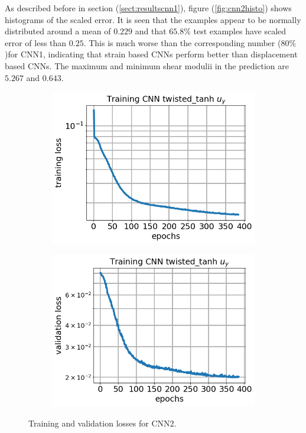 \documentclass[12pt]{article}
\newcommand{\nhghalfwidth}{0.48\linewidth}
\newcommand{\nhgtotalheight}{4cm}
\begin{document}
As described before in section (\ref{sect:resultscnn1}), figure (\ref{fig:cnn2histo}) shows histograms of the scaled error. It is seen that the examples appear to be normally distributed around a mean of ${0.229}$ and that $65.8\%$ test examples have scaled error of less than $0.25$. This is much worse than the corresponding number ($80\%$)for CNN1, indicating that strain based CNNs perform better than displacement based CNNs. The maximum and minimum shear modulii in the prediction are $5.267$ and $0.643$. 
\begin{figure}[!h]
  \centering
  \begin{subfigure}[c]{\nhghalfwidth}
    \centering
    \includegraphics[totalheight=\nhgtotalheight]{Figures/Results2/loss.png}
  \end{subfigure}
%  
  \begin{subfigure}[c]{\nhghalfwidth}
    \centering
    \includegraphics[totalheight=\nhgtotalheight]{Figures/Results2/val_loss.png}
  \end{subfigure}
  \caption{\label{fig:cnn2losses} Training and validation losses for CNN2.}
\end{figure}
\end{document}
